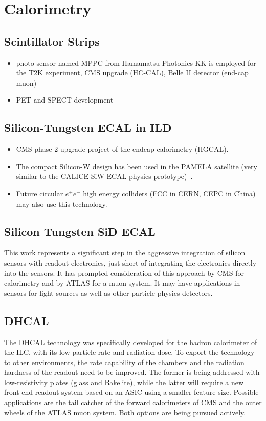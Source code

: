\section{Calorimetry}
\subsection{Scintillator Strips}
\begin{itemize}
	\item photo-sensor named MPPC from Hamamatsu Photonics KK is employed for the T2K experiment, CMS upgrade (HC-CAL), Belle II detector (end-cap muon)
	\item PET and SPECT development
\end{itemize}

\subsection{Silicon-Tungsten ECAL in ILD}
\begin{itemize}
\item CMS phase-2 upgrade project of the
 endcap calorimetry (HGCAL).
\item The compact Silicon-W design has been used in the PAMELA satellite (very
 similar to the CALICE SiW ECAL physics prototype)~\cite{1742-6596-160-1-012039}.
\item Future circular $e^+e^-$ high energy colliders (FCC in CERN, CEPC in China)
may also use this technology.
\end{itemize}

\subsection{Silicon Tungsten SiD ECAL}
This work represents a significant step in the aggressive integration of silicon sensors with readout electronics, just short of integrating the electronics directly into the sensors. It has prompted consideration of this approach by CMS for calorimetry and by ATLAS for a muon system.  It may have applications in sensors for light sources as well as other particle physics detectors.

\subsection{DHCAL}
The DHCAL technology was specifically developed for the hadron calorimeter of the ILC, with its low particle rate and radiation dose. To export the technology to other environments, the rate capability of the chambers and the radiation hardness of the readout need to be improved. The former is being addressed with low-resistivity plates (glass and Bakelite), while the latter will require a new front-end readout system based on an ASIC using a smaller feature size. Possible applications are the tail catcher of the forward calorimeters of CMS and the outer wheels of the ATLAS muon system. Both options are being pursued actively.

